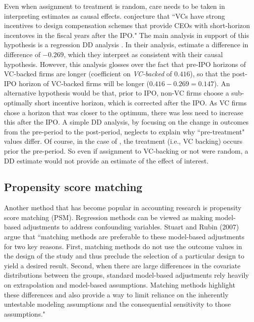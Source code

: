 \documentclass[11pt,reqno]{amsart}
\begin{document}
\begin{doublespace}
Even when assignment to treatment is random, care needs to be taken in interpreting estimates as causal effects.
\citet[p.\,1305]{Cadman:2014cr} conjecture that ``VCs have strong incentives to design compensation schemes that provide CEOs with short-horizon incentoves in the fiscal years after the IPO." 
The main analysis in support of this hypothesis is a regression DD analysis \citep[pp.\,233--241]{Angrist:2008vk}. 
In their analysis, \citet[Table 4, Panel A]{Cadman:2014cr} estimate a difference in difference of $-0.269$, which they interpret as consistent with their causal hypothesis.
However, this analysis glosses over the fact that pre-IPO horizons of VC-backed firms are longer (coefficient on \emph{VC-backed} of $0.416$), so that the post-IPO horizon of VC-backed firms will be longer ($0.416-0.269=0.147$).
An alternative hypothesis would be that, prior to IPO, non-VC firms choose a sub-optimally short incentive horizon, which is corrected after the IPO. 
As VC firms chose a horizon that was closer to the optimum, there was less need to increase this after the IPO.
A simple DD analysis, by focusing on the change in outcomes from the pre-period to the post-period, neglects to explain why ``pre-treatment" values differ.
Of course, in the case of \citet{Cadman:2014cr}, the treatment (i.e., VC backing) occurs prior the pre-period.
So even if assignment to VC-backing  or not were random, a DD estimate would not provide an estimate of the effect of interest.

\subsection{Propensity score matching}
Another method that has become popular in accounting research is propensity score matching (PSM).
Regression methods can be viewed as making model-based adjustments to address confounding variables.  
Stuart and Rubin (2007) argue that ``matching methods are preferable to these model-based adjustments for two key reasons. 
First, matching methods do not use the outcome values in the design of the study and thus preclude the selection of a particular design to yield a desired result.
Second, when there are large differences in the covariate distributions between the groups, standard model-based adjustments rely heavily on extrapolation and model-based assumptions.
Matching methods highlight these differences and also provide a way to limit reliance on the inherently untestable modeling assumptions and the consequential sensitivity to those assumptions."


\end{doublespace}
\end{document}
